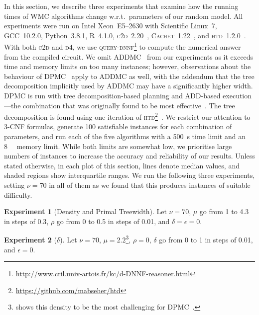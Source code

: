 \documentclass[letterpaper]{article} %
\theoremstyle{definition}
\newtheorem{experiment}{Experiment}
\theoremstyle{remark}
\begin{document}
In this section, we describe three experiments that examine how the running
times of \textsf{WMC} algorithms change w.r.t.\ parameters of our random model.
All experiments were run on Intel Xeon~E5--2630 with Scientific Linux~7,
GCC~10.2.0, Python~3.8.1, R~4.1.0,
\textsc{c2d}~2.20~\cite{DBLP:conf/ecai/Darwiche04},
\textsc{Cachet}~1.22~\cite{DBLP:conf/sat/SangBBKP04}, and
\textsc{htd}~1.2.0~\cite{DBLP:conf/cpaior/AbseherMW17}. With both \textsc{c2d}
and \textsc{d4}, we use
\textsc{query-dnnf}\footnote{\url{http://www.cril.univ-artois.fr/kc/d-DNNF-reasoner.html}}
to compute the numerical answer from the compiled circuit. We omit
\textsc{ADDMC}~\cite{DBLP:conf/aaai/DudekPV20} from our experiments as it
exceeds time and memory limits on too many instances; however, observations
about the behaviour of \textsc{DPMC}~\cite{DBLP:conf/cp/DudekPV20} apply to
\textsc{ADDMC} as well, with the addendum that the tree decomposition implicitly
used by \textsc{ADDMC} may have a significantly higher width. \textsc{DPMC} is
run with tree decomposition-based planning and ADD-based execution---the
combination that was originally found to be most
effective~\cite{DBLP:conf/cp/DudekPV20}. The tree decomposition is found using
one iteration of
\textsc{htd}\footnote{\url{https://github.com/mabseher/htd}}~\cite{DBLP:conf/cpaior/AbseherMW17}.
We restrict our attention to 3-CNF formulas, generate 100 satisfiable instances
for each combination of parameters, and run each of the five algorithms with a
\SI{500}{\second} time limit and an \SI{8}{\gibi\byte} memory limit. While both
limits are somewhat low, we prioritise large numbers of instances to increase
the accuracy and reliability of our results. Unless stated otherwise, in each
plot of this section, lines denote median values, and shaded regions show
interquartile ranges. We run the following three experiments, setting $\nu = 70$
in all of them as we found that this produces instances of suitable difficulty.

\begin{experiment}[Density and Primal Treewidth]\label{exp:density}
  Let $\nu = 70$, $\mu$ go from 1 to 4.3 in steps of 0.3, $\rho$ go from 0 to
  0.5 in steps of 0.01, and $\delta = \epsilon = 0$.
\end{experiment}

\begin{experiment}[$\delta$]\label{exp:delta}
  Let $\nu = 70$, $\mu = 2.2$\footnote{ shows this density to
    be the most challenging for \textsc{DPMC}~\cite{DBLP:conf/cp/DudekPV20}.},
  $\rho = 0$, $\delta$ go from 0 to 1 in steps of 0.01, and $\epsilon = 0$.
\end{experiment}
\end{document}
